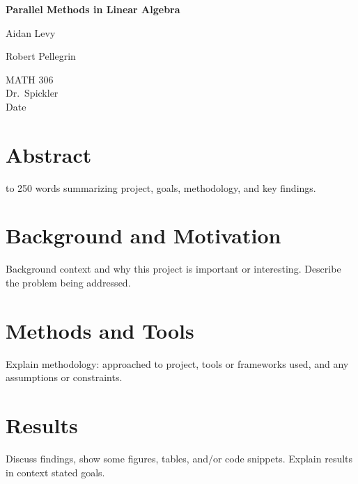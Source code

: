 \documentclass[12pt]{article}
\begin{document}
\begin{titlepage}
    \centering
    \vspace*{2in}
    {\Huge\bfseries Parallel Methods in Linear Algebra\par}
    \vspace{1in}
    {\Large Aidan Levy \par}
    {\Large Robert Pellegrin\par}
    \vspace{0.5in}
    {\large MATH 306\\ Dr.\ Spickler \\ Date\par}
    \vfill
\end{titlepage}

\newpage
\section*{Abstract}
\begin{singlespace}
     to 250 words summarizing project, goals, methodology, and key findings.
\end{singlespace}

\section{Background and Motivation}
Background context and why this project is important or interesting. Describe the problem being addressed.

\section{Methods and Tools}
Explain methodology: approached to project, tools or frameworks used, and any assumptions or constraints.

\section{Results}
Discuss findings, show some figures, tables, and/or code snippets.
Explain results in context stated goals.
\end{document}
